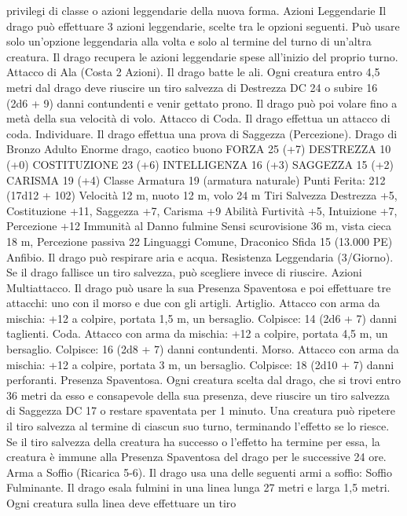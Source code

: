\begin{multicols}{2}
privilegi di classe o azioni leggendarie della nuova forma.
Azioni Leggendarie
Il drago può effettuare 3 azioni leggendarie, scelte tra le opzioni
seguenti. Può usare solo un’opzione leggendaria alla volta e solo
al termine del turno di un’altra creatura. Il drago recupera le
azioni leggendarie spese all’inizio del proprio turno.
Attacco di Ala (Costa 2 Azioni). Il drago batte le ali. Ogni
creatura entro 4,5 metri dal drago deve riuscire un tiro salvezza
di Destrezza DC 24 o subire 16 (2d6 + 9) danni contundenti e
venir gettato prono. Il drago può poi volare fino a metà della sua
velocità di volo.
Attacco di Coda. Il drago effettua un attacco di coda.
Individuare. Il drago effettua una prova di Saggezza
(Percezione).
Drago di Bronzo Adulto
Enorme drago, caotico buono
FORZA 25 (+7)
DESTREZZA 10 (+0)
COSTITUZIONE 23 (+6)
INTELLIGENZA 16 (+3)
SAGGEZZA 15 (+2)
CARISMA 19 (+4)
Classe Armatura 19 (armatura naturale)
\hspace*{0pt}\hfill{Punti Ferita}: 212 (17d12 + 102)
Velocità 12 m, nuoto 12 m, volo 24 m
Tiri Salvezza Destrezza +5, Costituzione +11, Saggezza +7,
Carisma +9
Abilità Furtività +5, Intuizione +7, Percezione +12
Immunità al Danno fulmine
Sensi scurovisione 36 m, vista cieca 18 m, Percezione passiva 22
Linguaggi Comune, Draconico
Sfida 15 (13.000 PE)
Anfibio. Il drago può respirare aria e acqua.
Resistenza Leggendaria (3/Giorno). Se il drago fallisce un tiro
salvezza, può scegliere invece di riuscire.
Azioni
Multiattacco. Il drago può usare la sua Presenza Spaventosa e
poi effettuare tre attacchi: uno con il morso e due con gli artigli.
Artiglio. Attacco con arma da mischia: +12 a colpire, portata 1,5
m, un bersaglio.
Colpisce: 14 (2d6 + 7) danni taglienti.
Coda. Attacco con arma da mischia: +12 a colpire, portata 4,5
m, un bersaglio.
Colpisce: 16 (2d8 + 7) danni contundenti.
Morso. Attacco con arma da mischia: +12 a colpire, portata 3 m,
un bersaglio.
Colpisce: 18 (2d10 + 7) danni perforanti.
Presenza Spaventosa. Ogni creatura scelta dal drago, che si trovi
entro 36 metri da esso e consapevole della sua presenza, deve
riuscire un tiro salvezza di Saggezza DC 17 o restare spaventata per
1 minuto. Una creatura può ripetere il tiro salvezza al termine di
ciascun suo turno, terminando l’effetto se lo riesce. Se il tiro salvezza
della creatura ha successo o l’effetto ha termine per essa, la creatura è
immune alla Presenza Spaventosa del drago per le successive 24 ore.
Arma a Soffio (Ricarica 5-6). Il drago usa una delle seguenti armi
a soffio:
Soffio Fulminante. Il drago esala fulmini in una linea lunga 27 metri
e larga 1,5 metri. Ogni creatura sulla linea deve effettuare un tiro

\end{multicols}
